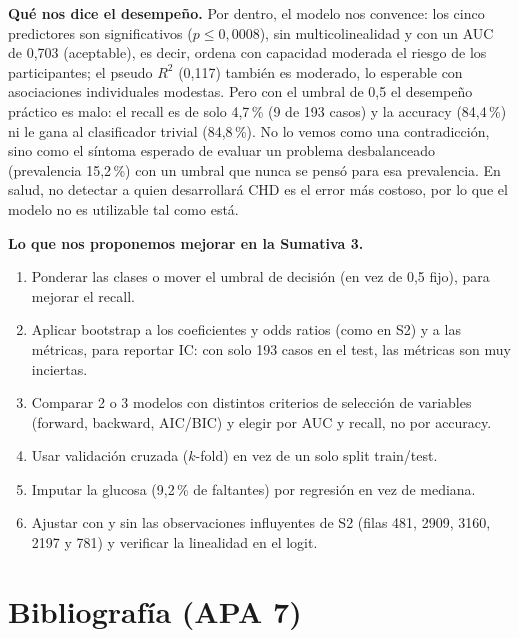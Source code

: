\documentclass[11pt,a4paper]{article}
\begin{document}
\textbf{Qué nos dice el desempeño.} Por dentro, el modelo nos convence: los cinco predictores son significativos ($p\leq0{,}0008$), sin multicolinealidad y con un AUC de 0,703 (aceptable), es decir, ordena con capacidad moderada el riesgo de los participantes; el pseudo $R^2$ (0,117) también es moderado, lo esperable con asociaciones individuales modestas. Pero con el umbral de 0,5 el desempeño práctico es malo: el recall es de solo 4,7\,\% (9 de 193 casos) y la accuracy (84,4\,\%) ni le gana al clasificador trivial (84,8\,\%). No lo vemos como una contradicción, sino como el síntoma esperado de evaluar un problema desbalanceado (prevalencia 15,2\,\%) con un umbral que nunca se pensó para esa prevalencia. En salud, no detectar a quien desarrollará CHD es el error más costoso, por lo que el modelo no es utilizable tal como está.

\textbf{Lo que nos proponemos mejorar en la Sumativa 3.}
\begin{enumerate}[nosep]
\item Ponderar las clases o mover el umbral de decisión (en vez de 0,5 fijo), para mejorar el recall.
\item Aplicar bootstrap a los coeficientes y odds ratios (como en S2) y a las métricas, para reportar IC: con solo 193 casos en el test, las métricas son muy inciertas.
\item Comparar 2 o 3 modelos con distintos criterios de selección de variables (forward, backward, AIC/BIC) y elegir por AUC y recall, no por accuracy.
\item Usar validación cruzada ($k$-fold) en vez de un solo split train/test.
\item Imputar la glucosa (9,2\,\% de faltantes) por regresión en vez de mediana.
\item Ajustar con y sin las observaciones influyentes de S2 (filas 481, 2909, 3160, 2197 y 781) y verificar la linealidad en el logit.
\end{enumerate}

\section{Bibliografía (APA 7)}
\end{document}
